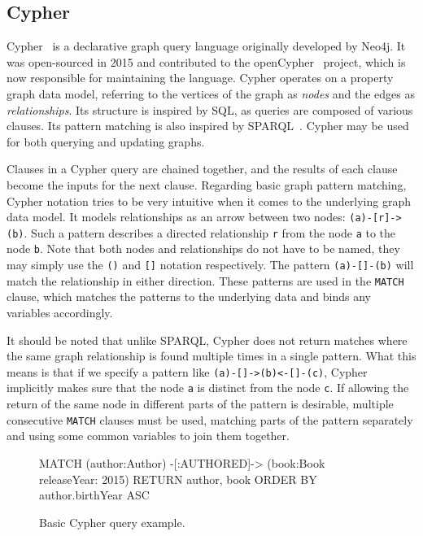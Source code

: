 \subsection{Cypher}

Cypher~\cite{opencypher} is a declarative graph query language originally developed by Neo4j.
It was open-sourced in 2015 and contributed to the openCypher~\cite{opencypher} project, which is now responsible for maintaining the language.
Cypher operates on a property graph data model, referring to the vertices of the graph as \textit{nodes} and the edges as \textit{relationships}.
Its structure is inspired by SQL, as queries are composed of various clauses.
Its pattern matching is also inspired by SPARQL~\cite{sparql}.
Cypher may be used for both querying and updating graphs.

Clauses in a Cypher query are chained together, and the results of each clause become the inputs for the next clause.
Regarding basic graph pattern matching, Cypher notation tries to be very intuitive when it comes to the underlying graph data model.
It models relationships as an arrow between two nodes: \texttt{(a)-[r]->(b)}.
Such a pattern describes a directed relationship \texttt{r} from the node \texttt{a} to the node \texttt{b}.
Note that both nodes and relationships do not have to be named, they may simply use the \texttt{()} and \texttt{[]} notation respectively.
The pattern \texttt{(a)-[]-(b)} will match the relationship in either direction.
These patterns are used in the \texttt{MATCH} clause, which matches the patterns to the underlying data and binds any variables accordingly.

It should be noted that unlike SPARQL, Cypher does not return matches where the same graph relationship is found multiple times in a single pattern.
What this means is that if we specify a pattern like \texttt{(a)-[]->(b)<-[]-(c)}, Cypher implicitly makes sure that the node \texttt{a} is distinct from the node \texttt{c}.
If allowing the return of the same node in different parts of the pattern is desirable, multiple consecutive \texttt{MATCH} clauses must be used, matching parts of the pattern separately and using some common variables to join them together.

\begin{figure}[ht]
\begin{code}[]
MATCH (author:Author) -[:AUTHORED]-> (book:Book {releaseYear: 2015})
RETURN author, book
ORDER BY author.birthYear ASC
\end{code}
\caption{Basic Cypher query example.}
\label{fig:cypherbasic}
\end{figure}

